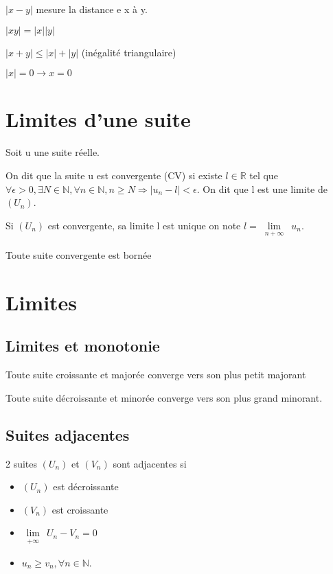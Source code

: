 \documentclass[french]{yLectureNote}
\newcommand{\Lim}[1]{\lim\limits_{\substack{#1}}\:}
\begin{document}
$|x-y|$ mesure la distance e x à y.

$|xy| = |x||y|$

$|x+y|\leq |x|+|y|$ (inégalité triangulaire)

$|x| = 0 \rightarrow x =0$


\section{Limites d'une suite}
Soit u une suite réelle.

\begin{theorem}[Définition]
On dit que la suite u est convergente (CV) si existe $l\in\mathbb{R}$ tel que $\forall \epsilon > 0,  \exists N\in\mathbb{N}, \forall n\in\mathbb{N}, n\geq N \Rightarrow  |u_n-l| < \epsilon$. On dit que l est une limite de $(U_n)$.
\end{theorem}
\begin{theorem}
Si $(U_n)$ est convergente, sa limite l est unique on note $l = \Lim{n+\infty} u_n$.
\end{theorem}




\begin{theorem}
Toute suite convergente est bornée
\end{theorem}

\section{Limites}
\subsection{Limites et monotonie}
\begin{theorem}[]
Toute suite croissante et majorée converge vers son plus petit majorant

Toute suite décroissante et minorée converge vers son plus grand minorant.
\end{theorem}
\subsection{Suites adjacentes}
\begin{theorem}[Définition]
2 suites $(U_n)$ et $(V_n)$ sont adjacentes si
\begin{itemize}
 \item $(U_n)$ est décroissante
 \item $(V_n)$ est croissante
 \item $\Lim{+\infty} U_n-V_n = 0$
 \item $u_n\geq v_n, \forall n\in\mathbb{N}$.
\end{itemize}
\end{theorem}
\end{document}
